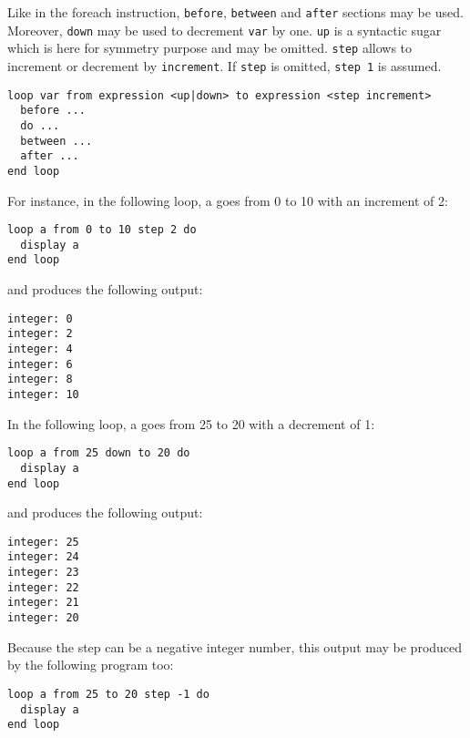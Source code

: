 \documentclass[11pt]{article}
\newcommand{\var}[1]{{\small\ttfamily #1}}
\begin{document}
Like in the foreach instruction, \lstinline{before},  \lstinline{between} and \lstinline{after} sections may be used. Moreover, \lstinline{down} may be used to decrement \lstinline{var} by one. \lstinline{up} is a syntactic sugar which is here for symmetry purpose and may be omitted. \lstinline{step} allows to increment or decrement by \lstinline{increment}. If \lstinline{step} is omitted, \lstinline{step 1} is assumed.

\begin{lstlisting}
loop var from expression <up|down> to expression <step increment>
  before ...
  do ...
  between ...
  after ...
end loop
\end{lstlisting}

For instance, in the following loop, \var{a} goes from 0 to 10 with an increment of 2:

\begin{lstlisting}
loop a from 0 to 10 step 2 do
  display a
end loop
\end{lstlisting}

and produces the following output:

{\small
\begin{verbatim}
integer: 0
integer: 2
integer: 4
integer: 6
integer: 8
integer: 10
\end{verbatim}
}

In the following loop, \var{a} goes from 25 to 20 with a decrement of 1:

\begin{lstlisting}
loop a from 25 down to 20 do
  display a
end loop
\end{lstlisting}

and produces the following output:

{\small
\begin{verbatim}
integer: 25
integer: 24
integer: 23
integer: 22
integer: 21
integer: 20
\end{verbatim}
}

Because the step can be a negative integer number, this output may be produced by the following program too:

\begin{lstlisting}
loop a from 25 to 20 step -1 do
  display a
end loop
\end{lstlisting}
\end{document}
